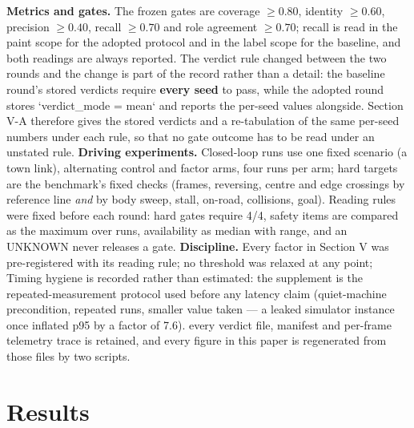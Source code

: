 \documentclass[journal]{IEEEtran}
\begin{document}
\textbf{Metrics and gates.} The frozen gates are coverage $\ge 0.80$, identity $\ge 0.60$, precision
$\ge 0.40$, recall $\ge 0.70$ and role agreement $\ge 0.70$; recall is read in the paint scope for
the adopted protocol and in the label scope for the baseline, and both readings are always reported.
The verdict rule changed between the two rounds and the change is part of the record rather than a detail:
the baseline round's stored verdicts require \textbf{every seed} to pass, while the adopted round stores
`verdict_mode = mean` and reports the per-seed values alongside. Section V-A therefore gives the stored
verdicts and a re-tabulation of the same per-seed numbers under each rule, so that no gate outcome has to
be read under an unstated rule.
\textbf{Driving experiments.} Closed-loop runs use one fixed scenario (a town link), alternating control
and factor arms, four runs per arm; hard targets are the benchmark's fixed checks
(frames, reversing, centre and edge crossings by reference line \emph{and} by body sweep, stall,
on-road, collisions, goal). Reading rules were fixed before each round: hard gates require 4/4,
safety items are compared as the maximum over runs, availability as median with range, and an
UNKNOWN never releases a gate.
\textbf{Discipline.} Every factor in Section V was pre-registered with its reading rule; no threshold was
relaxed at any point;
Timing hygiene is recorded rather than estimated: the supplement is the repeated-measurement protocol used before any latency claim (quiet-machine precondition, repeated runs, smaller value taken --- a leaked simulator instance once inflated p95 by a factor of 7.6). every verdict file, manifest and per-frame telemetry trace is retained, and
every figure in this paper is regenerated from those files by two scripts.
\section{Results}
\end{document}
